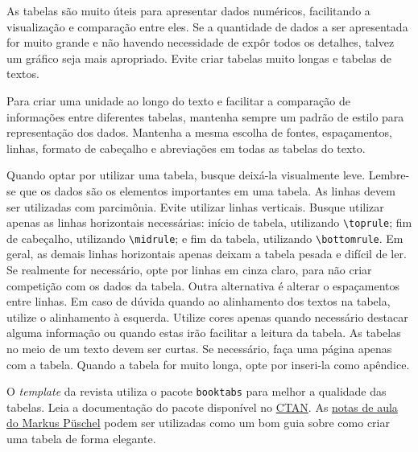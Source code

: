 \documentclass{textolivre}
\begin{document}
As tabelas são muito úteis para apresentar dados numéricos, facilitando a visualização e comparação entre eles.
Se a quantidade de dados a ser apresentada for muito grande e não havendo necessidade de expôr todos os detalhes,
talvez um gráfico seja mais apropriado. Evite criar tabelas muito longas e tabelas de textos.

Para criar uma unidade ao longo do texto e facilitar a comparação de informações entre diferentes tabelas,
mantenha sempre um padrão de estilo para representação dos dados. Mantenha a mesma escolha de fontes,
espaçamentos, linhas, formato de cabeçalho e abreviações em todas as tabelas do texto. 

Quando optar por utilizar uma tabela, busque deixá-la visualmente leve. Lembre-se que os dados são os elementos
importantes em uma tabela. As linhas devem ser utilizadas com parcimônia. 
Evite utilizar linhas verticais. Busque utilizar apenas as linhas horizontais 
necessárias: início de tabela, utilizando \verb|\toprule|; fim de cabeçalho, utilizando \verb|\midrule|; e
fim da tabela, utilizando \verb|\bottomrule|. Em geral, as demais linhas horizontais apenas deixam a tabela
pesada e difícil de ler. Se realmente for necessário, opte por linhas em cinza claro, para não criar competição 
com os dados da tabela. Outra alternativa é alterar o espaçamentos entre linhas. Em caso de dúvida quando ao alinhamento 
dos textos na tabela, utilize o alinhamento à esquerda. Utilize cores apenas quando necessário destacar
alguma informação ou quando estas irão facilitar a leitura da tabela. As tabelas no meio de um texto devem ser curtas.
Se necessário, faça uma página apenas com a tabela. Quando a tabela for muito longa, opte por inseri-la como apêndice.

O \emph{template} da revista utiliza o pacote \verb|booktabs| para melhor a qualidade das tabelas. 
Leia a documentação do pacote disponível no \href{https://www.ctan.org/pkg/booktabs}{CTAN}. 
As \href{https://people.inf.ethz.ch/markusp/teaching/guides/guide-tables.pdf}{notas de aula do Markus Püschel}
podem ser utilizadas como um bom guia sobre como criar uma tabela de forma elegante.
\end{document}
